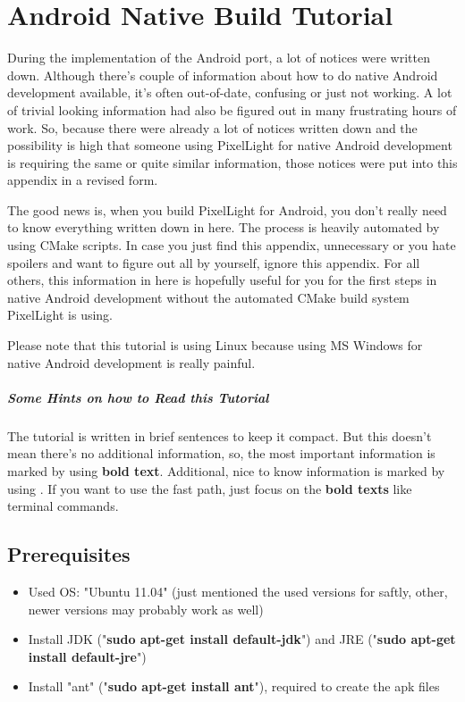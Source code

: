\chapter{Android Native Build Tutorial}
During the implementation of the Android port, a lot of notices were written down. Although there's couple of information about how to do native Android development available, it's often out-of-date, confusing or just not working. A lot of trivial looking information had also be figured out in many frustrating hours of work. So, because there were already a lot of notices written down and the possibility is high that someone using PixelLight for native Android development is requiring the same or quite similar information, those notices were put into this appendix in a revised form.

The good news is, when you build PixelLight for Android, you don't really need to know everything written down in here. The process is heavily automated by using CMake scripts. In case you just find this appendix, unnecessary or you hate spoilers and want to figure out all by yourself, ignore this appendix. For all others, this information in here is hopefully useful for you for the first steps in native Android development without the automated CMake build system PixelLight is using.

Please note that this tutorial is using Linux because using MS Windows for native Android development is really painful.


\paragraph{Some Hints on how to Read this Tutorial}
The tutorial is written in brief sentences to keep it compact. But this doesn't mean there's no additional information, so, the most important information is marked by using \textbf{bold text}. Additional, nice to know information is marked by using \textrightarrow. If you want to use the fast path, just focus on the \textbf{bold texts} like terminal commands.




\section{Prerequisites}
\begin{itemize}
\item{Used OS: "Ubuntu 11.04" (just mentioned the used versions for saftly, other, newer versions may probably work as well)}
\item{Install JDK ("\textbf{sudo apt-get install default-jdk}") and JRE ("\textbf{sudo apt-get install default-jre}")}
\item{Install "ant" ("\textbf{sudo apt-get install ant}"), required to create the apk files}
\end{itemize}



